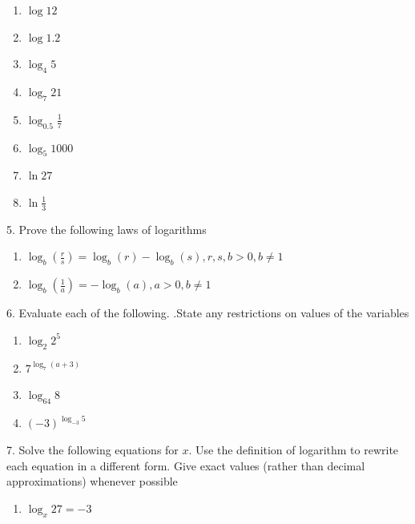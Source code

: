 \documentclass[10pt,]{book}
\theoremstyle{plain}
\theoremstyle{definition}
\theoremstyle{definition}
\theoremstyle{definition}
\numberwithin{equation}{section}
\newcommand{\gt}{>}
\begin{document}
\begin{exerciselist}
\begin{enumerate}[label=(\alph*)]
\item\hypertarget{li-192}{}\(\log 12\)%
\item\hypertarget{li-193}{}\(\log 1.2\)%
\item\hypertarget{li-194}{}\(\log_4 5\)%
\item\hypertarget{li-195}{}\(\log_7 21\)%
\item\hypertarget{li-196}{}\(\log_{0.5} \frac{1}{7}\)%
\item\hypertarget{li-197}{}\(\log_5 1000\)%
\item\hypertarget{li-198}{}\(\ln 27\)%
\item\hypertarget{li-199}{}\(\ln \frac{1}{3}\)%
\end{enumerate}
\par\smallskip
\item[5.]\hypertarget{exercise-79}{}\hypertarget{p-303}{}%
Prove the following laws of logarithms%
\leavevmode%
\begin{enumerate}[label=(\alph*)]
\item\hypertarget{li-200}{}\(\log_b \left( \frac{r}{s} \right) = \log_b(r) - \log_b(s), r, s, b > 0, b \neq 1\)%
\item\hypertarget{li-201}{}\(\log_b \left( \frac{1}{a} \right) = -\log_b(a),  a \gt 0, b \neq 1\)%
\end{enumerate}
\par\smallskip
\item[6.]\hypertarget{exercise-80}{}\hypertarget{p-304}{}%
Evaluate each of the following. .State any restrictions on values of the variables%
\leavevmode%
\begin{enumerate}[label=(\alph*)]
\item\hypertarget{li-202}{}\(\log_2 2^5\)%
\item\hypertarget{li-203}{}\(7 ^ {\log_7 \left( a+3 \right)}\)%
\item\hypertarget{li-204}{}\(\log_{64} 8\)%
\item\hypertarget{li-205}{}\(\left( -3 \right)^{\log_{-3}5}\)%
\end{enumerate}
\par\smallskip
\item[7.]\hypertarget{exercise-81}{}\hypertarget{p-305}{}%
Solve the following equations for \(x\). Use the definition of logarithm to rewrite each equation in a different form.  Give exact values (rather than decimal approximations) whenever possible%
\leavevmode%
\begin{enumerate}[label=(\alph*)]
\item\hypertarget{li-206}{}\(\log_x 27 = -3\)%

\end{enumerate}
\end{exerciselist}
\end{document}
